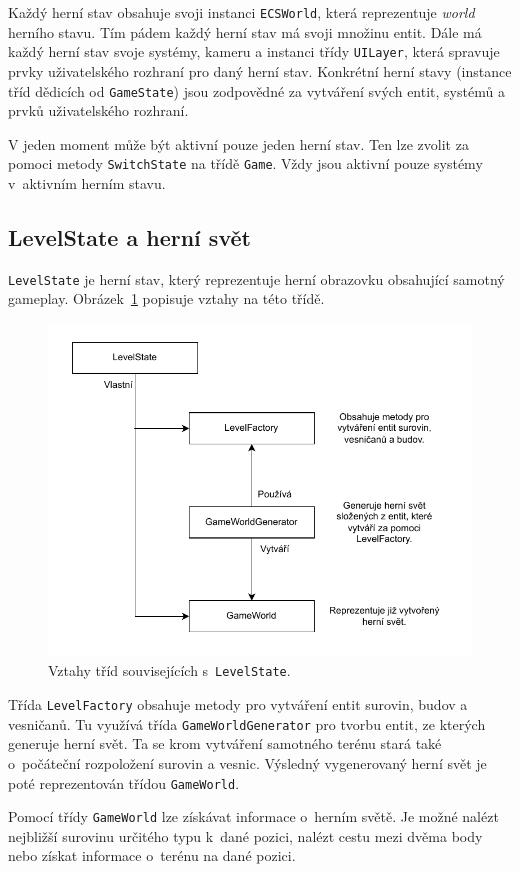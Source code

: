Každý herní stav obsahuje svoji instanci \texttt{ECSWorld}, která reprezentuje \textit{world} herního stavu. Tím pádem každý herní stav má svoji množinu entit. Dále má každý herní stav svoje systémy, kameru a instanci třídy \texttt{UILayer}, která spravuje prvky uživatelského rozhraní pro daný herní stav. Konkrétní herní stavy (instance tříd dědicích od \texttt{GameState}) jsou zodpovědné za vytváření svých entit, systémů a prvků uživatelského rozhraní.

V jeden moment může být aktivní pouze jeden herní stav. Ten lze zvolit za pomoci metody \texttt{SwitchState} na třídě \texttt{Game}. Vždy jsou aktivní pouze systémy v~aktivním herním stavu.

\subsection{LevelState a herní svět}
\texttt{LevelState} je herní stav, který reprezentuje herní obrazovku obsahující samotný gameplay. Obrázek~\ref{fig:level-state} popisuje vztahy na této třídě.

\begin{figure}[!htb]
  \centering
  \includegraphics[width=0.7\linewidth]{img/level-state.pdf}
  \caption{Vztahy tříd souvisejících s~\texttt{LevelState}.}
  \label{fig:level-state}
\end{figure}

Třída \texttt{LevelFactory} obsahuje metody pro vytváření entit surovin, budov a vesničanů. Tu využívá třída \texttt{GameWorldGenerator} pro tvorbu entit, ze kterých generuje herní svět. Ta se krom vytváření samotného terénu stará také o~počáteční rozpoložení surovin a vesnic. Výsledný vygenerovaný herní svět je poté reprezentován třídou \texttt{GameWorld}.

Pomocí třídy \texttt{GameWorld} lze získávat informace o~herním světě. Je možné nalézt nejbližší surovinu určitého typu k~dané pozici, nalézt cestu mezi dvěma body nebo získat informace o~terénu na dané pozici.

